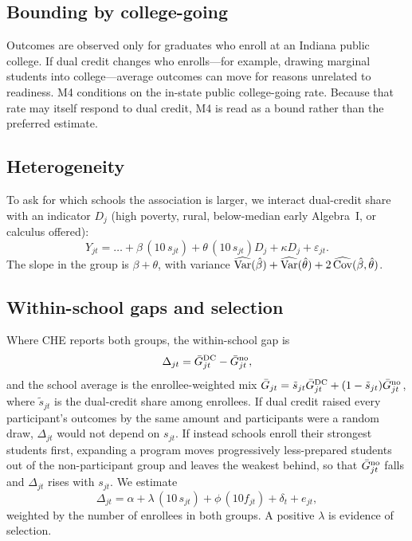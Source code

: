 \documentclass[aps,prd,reprint,superscriptaddress,nofootinbib,floatfix]{revtex4-2}
\newcommand{\DC}{\mathrm{DC}}
\begin{document}
\subsection{Bounding by college-going}

Outcomes are observed only for graduates who enroll at an Indiana public college. If dual credit changes who enrolls---for example, drawing marginal students into college---average outcomes can move for reasons unrelated to readiness. M4 conditions on the in-state public college-going rate. Because that rate may itself respond to dual credit, M4 is read as a bound rather than the preferred estimate.

\subsection{Heterogeneity}

To ask for which schools the association is larger, we interact dual-credit share with an indicator $D_j$ (high poverty, rural, below-median early Algebra~I, or calculus offered):
\begin{equation}
Y_{jt}=\dots+\beta\,(10\,s_{jt})+\theta\,(10\,s_{jt})D_j+\kappa D_j+\varepsilon_{jt}.\label{eq:het}
\end{equation}
The slope in the group is $\beta+\theta$, with variance $\widehat{\rm Var}(\hat\beta)+\widehat{\rm Var}(\hat\theta)+2\,\widehat{\rm Cov}(\hat\beta,\hat\theta)$.

\subsection{Within-school gaps and selection}

Where CHE reports both groups, the within-school gap is
\begin{equation}
\Delta_{jt}=\bar G^{\DC}_{jt}-\bar G^{\rm no}_{jt},\label{eq:gap}
\end{equation}
and the school average is the enrollee-weighted mix $\bar G_{jt}=\tilde s_{jt}\bar G^{\DC}_{jt}+(1-\tilde s_{jt})\bar G^{\rm no}_{jt}$, where $\tilde s_{jt}$ is the dual-credit share among enrollees. If dual credit raised every participant's outcomes by the same amount and participants were a random draw, $\Delta_{jt}$ would not depend on $s_{jt}$. If instead schools enroll their strongest students first, expanding a program moves progressively less-prepared students out of the non-participant group and leaves the weakest behind, so that $\bar G^{\rm no}_{jt}$ falls and $\Delta_{jt}$ rises with $s_{jt}$. We estimate
\begin{equation}
\Delta_{jt}=\alpha+\lambda\,(10\,s_{jt})+\phi\,(10f_{jt})+\delta_t+e_{jt},\label{eq:gapreg}
\end{equation}
weighted by the number of enrollees in both groups. A positive $\lambda$ is evidence of selection.
\end{document}
